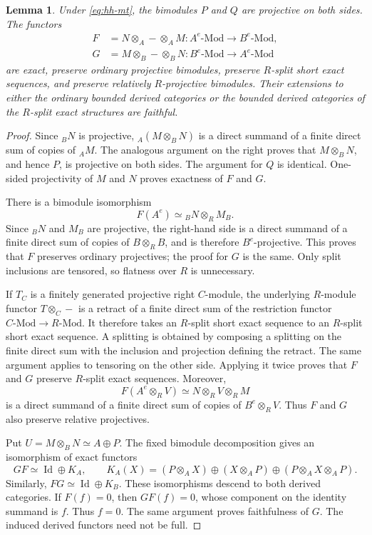 \documentclass[12pt,a4paper,english,reqno]{amsart}
\numberwithin{equation}{section}
\theoremstyle{plain}
\newtheorem{lemma}[theorem]{Lemma}
\theoremstyle{definition}
\begin{document}
\begin{lemma}\label{lem:hh-tensor-properties}
Under \eqref{eq:hh-mt}, the bimodules $P$ and $Q$ are projective on
both sides.  The functors
\[
 \begin{aligned}
 F&=N\otimes_A-\otimes_A M:A^e\text{-}\mathrm{Mod}
       \longrightarrow B^e\text{-}\mathrm{Mod},\\
 G&=M\otimes_B-\otimes_B N:B^e\text{-}\mathrm{Mod}
       \longrightarrow A^e\text{-}\mathrm{Mod}
 \end{aligned}
\]
are exact, preserve ordinary projective bimodules, preserve $R$-split
short exact sequences, and preserve relatively $R$-projective
bimodules.  Their extensions to either the ordinary bounded derived
categories or the bounded derived categories of the $R$-split exact
structures are faithful.
\end{lemma}

\begin{proof}
Since ${}_BN$ is projective, ${}_A(M\otimes_BN)$ is a direct summand of
a finite direct sum of copies of ${}_AM$.  The analogous argument on
the right proves that $M\otimes_BN$, and hence $P$, is projective on
both sides.  The argument for $Q$ is identical.  One-sided
projectivity of $M$ and $N$ proves exactness of $F$ and $G$.

There is a bimodule isomorphism
\[
 F(A^e)\simeq {}_BN\otimes_R M_B.
\]
Since ${}_BN$ and $M_B$ are projective, the right-hand side is a direct
summand of a finite direct sum of copies of $B\otimes_R B$, and is
therefore $B^e$-projective.  This proves that $F$ preserves ordinary
projectives; the proof for $G$ is the same.  Only split inclusions are
tensored, so flatness over $R$ is unnecessary.

If $T_C$ is a finitely generated projective right
$C$-module, the underlying $R$-module functor $T\otimes_C-$ is a
retract of a finite direct sum of the restriction functor
$C\text{-}\mathrm{Mod}\to R\text{-}\mathrm{Mod}$.  It therefore
takes an $R$-split short exact sequence to an $R$-split short exact
sequence.  A splitting is obtained by composing a splitting on the
finite direct sum with the inclusion and projection defining the
retract.  The same argument applies to tensoring on the other side.
Applying it twice proves that $F$ and $G$ preserve $R$-split exact
sequences.
Moreover,
\[
 F(A^e\otimes_R V)\simeq N\otimes_R V\otimes_R M
\]
is a direct summand of a finite direct sum of copies of
$B^e\otimes_R V$.  Thus $F$ and $G$ also preserve relative
projectives.

Put $U=M\otimes_BN\simeq A\oplus P$.  The fixed bimodule
decomposition gives an isomorphism of exact functors
\begin{equation}
 GF\simeq\operatorname{Id}\oplus K_A,
 \qquad
 K_A(X)=(P\otimes_AX)\oplus(X\otimes_AP)
           \oplus(P\otimes_AX\otimes_AP).
 \label{eq:hh-gf-splitting}
\end{equation}
Similarly, $FG\simeq\operatorname{Id}\oplus K_B$.
These isomorphisms descend to both derived categories.  If $F(f)=0$,
then $GF(f)=0$, whose component on the identity summand is $f$.
Thus $f=0$.  The same argument proves faithfulness of $G$.
The induced derived functors need not be full.
\end{proof}
\end{document}
